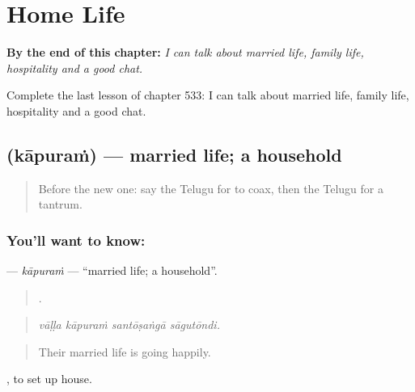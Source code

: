 
\chapter{Home Life}
\label{ch:te-home-life}

\begin{chapteropening}
\textbf{By the end of this chapter:} \emph{I can talk about married life, family life, hospitality and a good chat.}

Complete the last lesson of chapter 533: I can talk about married life, family life, hospitality and a good chat.
\end{chapteropening}

\section[\texorpdfstring{\te{కాపురం} (kāpuraṁ)}{కాపురం (kāpuraṁ)}]{ (kāpuraṁ) — married life; a household}

\label{lesson:TE-C533-kapuram}



\begin{quote}
Before the new one: say the Telugu for to coax, then the Telugu for a tantrum.
\end{quote}

\subsection*{You'll want to know: }
\textbf{} — \emph{kāpuraṁ} — \textquotedblleft{}married life; a household\textquotedblright{}.

\begin{quote}
   .
\end{quote}

\begin{quote}
\emph{vāḷḷa kāpuraṁ santōṣaṅgā sāgutōndi.}
\end{quote}

\begin{quote}
Their married life is going happily.
\end{quote}

 , to set up house.

